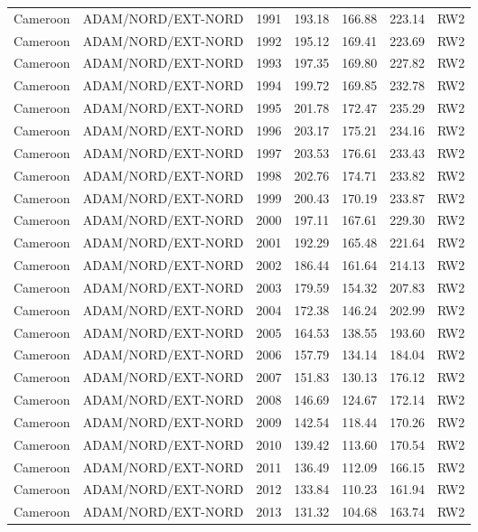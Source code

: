 \begin{longtable}{lllrrrl}
  Cameroon & ADAM/NORD/EXT-NORD & 1991 & 193.18 & 166.88 & 223.14 & RW2 \\ 
  Cameroon & ADAM/NORD/EXT-NORD & 1992 & 195.12 & 169.41 & 223.69 & RW2 \\ 
  Cameroon & ADAM/NORD/EXT-NORD & 1993 & 197.35 & 169.80 & 227.82 & RW2 \\ 
  Cameroon & ADAM/NORD/EXT-NORD & 1994 & 199.72 & 169.85 & 232.78 & RW2 \\ 
  Cameroon & ADAM/NORD/EXT-NORD & 1995 & 201.78 & 172.47 & 235.29 & RW2 \\ 
  Cameroon & ADAM/NORD/EXT-NORD & 1996 & 203.17 & 175.21 & 234.16 & RW2 \\ 
  Cameroon & ADAM/NORD/EXT-NORD & 1997 & 203.53 & 176.61 & 233.43 & RW2 \\ 
  Cameroon & ADAM/NORD/EXT-NORD & 1998 & 202.76 & 174.71 & 233.82 & RW2 \\ 
  Cameroon & ADAM/NORD/EXT-NORD & 1999 & 200.43 & 170.19 & 233.87 & RW2 \\ 
  Cameroon & ADAM/NORD/EXT-NORD & 2000 & 197.11 & 167.61 & 229.30 & RW2 \\ 
  Cameroon & ADAM/NORD/EXT-NORD & 2001 & 192.29 & 165.48 & 221.64 & RW2 \\ 
  Cameroon & ADAM/NORD/EXT-NORD & 2002 & 186.44 & 161.64 & 214.13 & RW2 \\ 
  Cameroon & ADAM/NORD/EXT-NORD & 2003 & 179.59 & 154.32 & 207.83 & RW2 \\ 
  Cameroon & ADAM/NORD/EXT-NORD & 2004 & 172.38 & 146.24 & 202.99 & RW2 \\ 
  Cameroon & ADAM/NORD/EXT-NORD & 2005 & 164.53 & 138.55 & 193.60 & RW2 \\ 
  Cameroon & ADAM/NORD/EXT-NORD & 2006 & 157.79 & 134.14 & 184.04 & RW2 \\ 
  Cameroon & ADAM/NORD/EXT-NORD & 2007 & 151.83 & 130.13 & 176.12 & RW2 \\ 
  Cameroon & ADAM/NORD/EXT-NORD & 2008 & 146.69 & 124.67 & 172.14 & RW2 \\ 
  Cameroon & ADAM/NORD/EXT-NORD & 2009 & 142.54 & 118.44 & 170.26 & RW2 \\ 
  Cameroon & ADAM/NORD/EXT-NORD & 2010 & 139.42 & 113.60 & 170.54 & RW2 \\ 
  Cameroon & ADAM/NORD/EXT-NORD & 2011 & 136.49 & 112.09 & 166.15 & RW2 \\ 
  Cameroon & ADAM/NORD/EXT-NORD & 2012 & 133.84 & 110.23 & 161.94 & RW2 \\ 
  Cameroon & ADAM/NORD/EXT-NORD & 2013 & 131.32 & 104.68 & 163.74 & RW2 \\ 

\end{longtable}
